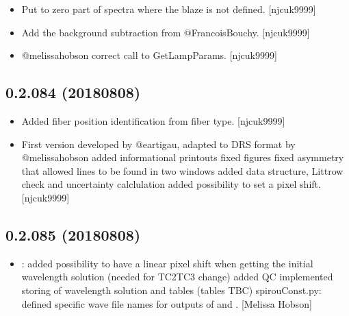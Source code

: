 \documentclass[a4paper,10pt,english]{report}
\begin{document}
\begin{itemize}
\item {} 
Put to zero part of spectra where the blaze is not defined.
{[}njcuk9999{]}

\item {} 
Add the background subtraction \sphinxhyphen{} from @FrancoisBouchy. {[}njcuk9999{]}

\item {} 
@melissa\sphinxhyphen{}hobson correct call to GetLampParams. {[}njcuk9999{]}

\end{itemize}


\subsection{0.2.084 (2018\sphinxhyphen{}08\sphinxhyphen{}08)}
\label{\detokenize{misc/changelog:id396}}\begin{itemize}
\item {} 
Added fiber position identification from fiber type. {[}njcuk9999{]}

\item {} 
First version  developed by @eartigau, adapted to DRS format
by @melissa\sphinxhyphen{}hobson added informational printouts \sphinxhyphen{} fixed figures \sphinxhyphen{}
fixed asymmetry that allowed lines to be found in two windows \sphinxhyphen{} added
 data structure, Littrow check and uncertainty calclulation
added possibility to set a pixel shift. {[}njcuk9999{]}

\end{itemize}


\subsection{0.2.085 (2018\sphinxhyphen{}08\sphinxhyphen{}08)}
\label{\detokenize{misc/changelog:id397}}\begin{itemize}
\item {} 
: \sphinxhyphen{} added possibility to have a linear pixel
shift when getting the initial wavelength solution (needed for TC2\sphinxhyphen{}TC3
change) \sphinxhyphen{} added QC \sphinxhyphen{} implemented storing of wavelength solution and
tables (tables TBC) spirouConst.py: defined specific wave file names
for outputs of  and .
{[}Melissa Hobson{]}

\end{itemize}
\end{document}
